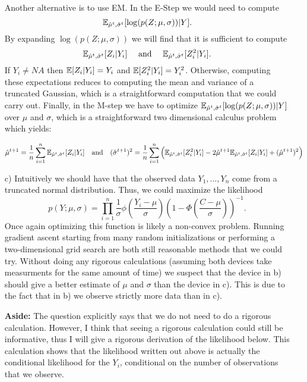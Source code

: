 \begin{enumerate}
Another alternative is to use EM. In the E-Step we would need to compute
\[
\mathbb{E}_{\hat{\mu}^t,\hat{\sigma}^t}[\log(p(Z;\mu,\sigma) ) | Y].
\]
By expanding $\log(p(Z;\mu,\sigma) )$ we will find that it is sufficient to compute 
\[
 \mme_{\hat{\mu}^t,\hat{\sigma}^t}[Z_i | Y_i] \ \ \ \text{ and } \ \ \ \mme_{\hat{\mu}^t,\hat{\sigma}^t}[Z_i^2 | Y_i].
\]
If $Y_i \neq NA$ then $ \mathbb{E}[Z_i | Y_i]  = Y_i$ and $\mathbb{E}[Z_i^2 | Y_i] = Y_i^2$. Otherwise, computing these expectations reduces to computing the mean and variance of a truncated Gaussian, which is a straightforward computation that we could carry out. Finally, in the M-step we have to optimize $\mathbb{E}_{\hat{\mu}^t,\hat{\sigma}^t}[\log(p(Z;\mu,\sigma) ) | Y]$ over $\mu$ and $\sigma$, which is a straightforward two dimensional calculus problem which yields:

$$\hat{\mu}^{t+1} = \frac{1}{n} \sum_{i=1}^n \mathbb{E}_{\hat{\mu}^t,\hat{\sigma}^t}[Z_i|Y_i] \quad \text{and} \quad (\hat{\sigma}^{t+1})^2 = \frac{1}{n} \sum_{i=1}^n \Big( \mathbb{E}_{\hat{\mu}^t,\hat{\sigma}^t}[Z_i^2|Y_i] -2 \hat{\mu}^{t+1}  \mathbb{E}_{\hat{\mu}^t,\hat{\sigma}^t}[Z_i|Y_i] + (\hat{\mu}^{t+1})^2 \Big)$$
\item[c)]
Intuitively we should have that the observed data $Y_1,\dots,Y_n$ come from a truncated normal distribution. Thus, we could maximize the likelihood
\[
p(Y;\mu,\sigma) = \prod_{i=1}^n \frac{1}{\sigma} \phi\left(\frac{Y_i - \mu}{\sigma}\right)\left( 1- \Phi\left(\frac{C - \mu}{\sigma}\right) \right)^{-1}.
\]
Once again optimizing this function is likely a non-convex problem. Running gradient ascent starting from  many random initializations or performing a two-dimensional grid search are both still reasonable methods that we could try. Without doing any rigorous calculations (assuming both devices take measurments for the same amount of time) we suspect that the device in b) should give a better estimate of $\mu$ and $\sigma$ than the device in c). This is due to the fact that in b) we observe strictly more data than in c).

\textbf{Aside:} The question explicitly says that we do not need to do a rigorous calculation. However, I think that seeing a rigorous calculation could still be informative, thus I will give a rigorous derivation of the likelihood below. This calculation shows that the likelihood written out above is actually the conditional likelihood for the $Y_i$, conditional on the number of observations that we observe.


\end{enumerate}
